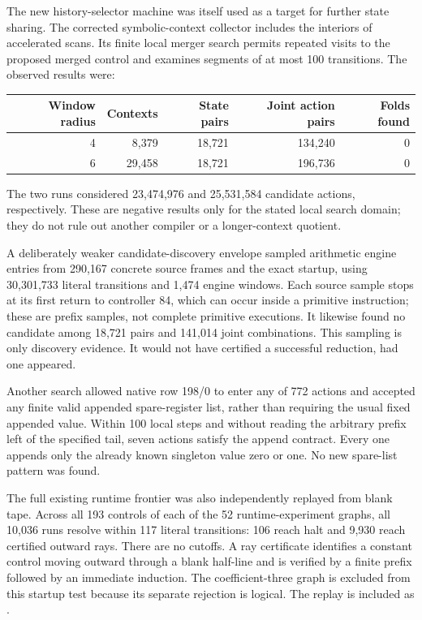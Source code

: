 The new history-selector machine was itself used as a target for further
state sharing. The corrected symbolic-context collector includes the
interiors of accelerated scans. Its finite local merger search permits
repeated visits to the proposed merged control and examines segments of
at most 100 transitions. The observed results were:
\begin{center}\small
\begin{tabular}{@{}rrrrr@{}}
\toprule
Window radius & Contexts & State pairs & Joint action pairs & Folds found\\
\midrule
4 & 8,379 & 18,721 & 134,240 & 0\\
6 & 29,458 & 18,721 & 196,736 & 0\\
\bottomrule
\end{tabular}
\end{center}
The two runs considered 23,474,976 and 25,531,584 candidate actions,
respectively. These are negative results only for the stated local search
domain; they do not rule out another compiler or a longer-context quotient.

A deliberately weaker candidate-discovery envelope sampled arithmetic
engine entries from 290,167 concrete source frames and the exact startup,
using 30,301,733 literal transitions and 1,474 engine windows. Each source
sample stops at its first return to controller 84, which can occur inside
a primitive instruction; these are prefix samples, not complete primitive
executions. It likewise
found no candidate among 18,721 pairs and 141,014 joint combinations.
This sampling is only discovery evidence. It would not have certified a
successful reduction, had one appeared.

Another search allowed native row 198/0 to enter any of 772 actions and
accepted any finite valid appended spare-register list, rather than
requiring the usual fixed appended value. Within 100 local steps and
without reading the arbitrary prefix left of the specified tail, seven
actions satisfy the append contract. Every one appends only the already
known singleton value zero or one. No new spare-list pattern was found.

The full existing runtime frontier was also independently replayed from
blank tape. Across all 193 controls of each of the 52 runtime-experiment
graphs, all 10,036 runs resolve within 117 literal transitions: 106 reach
halt and 9,930 reach certified outward rays. There are no cutoffs. A ray
certificate identifies a constant control moving outward through a blank
half-line and is verified by a finite prefix followed by an immediate
induction. The coefficient-three graph is excluded from this startup test
because its separate rejection is logical. The replay is included as
.
